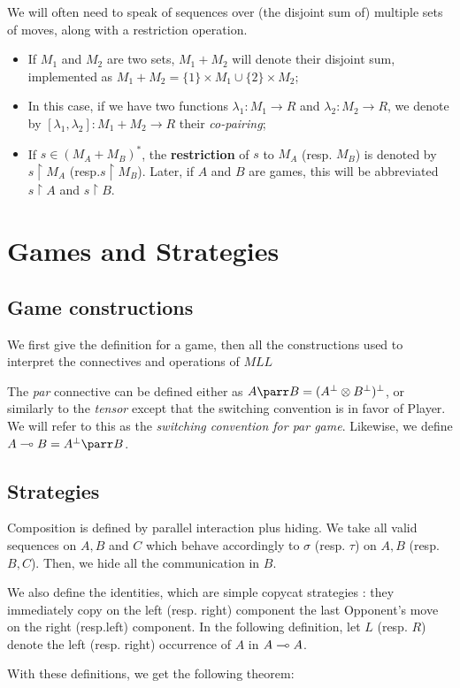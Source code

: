We will often need to speak of sequences over (the disjoint sum of)
multiple sets of moves, along with a restriction operation.

\begin{itemize}
\tightlist
\item
  If \(M_1\) and \(M_2\) are two sets, \(M_1 + M_2\) will denote their
  disjoint sum, implemented as
  \(M_1 + M_2 = \{1\}\times M_1 \cup \{2\}\times M_2\);
\item
  In this case, if we have two functions \(\lambda_1:M_1 \to R\) and
  \(\lambda_2:M_2\to R\), we denote by
  \([\lambda_1,\lambda_2]:M_1 + M_2 \to R\) their \emph{co-pairing};
\item
  If \(s\in (M_A + M_B)^*\), the \textbf{restriction} of \(s\) to
  \(M_A\) (resp. \(M_B\)) is denoted by \(s\upharpoonright M_A\)
  (resp.\(s \upharpoonright M_B\)). Later, if \(A\) and \(B\) are games,
  this will be abbreviated \(s\upharpoonright A\) and
  \(s\upharpoonright B\).
\end{itemize}

\section{Games and Strategies}\label{games-and-strategies}

\subsection{Game constructions}\label{game-constructions}

We first give the definition for a game, then all the constructions used
to interpret the connectives and operations of \(MLL\)

The \emph{par} connective can be defined either as
\(A\parr B = (A^\bot \tens B^\bot)^\bot\), or similarly to the
\emph{tensor} except that the switching convention is in favor of
Player. We will refer to this as the \emph{switching convention for par
game}. Likewise, we define \(A\limp B = A
^\bot\parr B\).

\subsection{Strategies}\label{strategies}

Composition is defined by parallel interaction plus hiding. We take all
valid sequences on \(A, B\) and \(C\) which behave accordingly to
\(\sigma\) (resp. \(\tau\)) on \(A, B\) (resp. \(B,C\)). Then, we hide
all the communication in \(B\).

We also define the identities, which are simple copycat strategies :
they immediately copy on the left (resp. right) component the last
Opponent's move on the right (resp.left) component. In the following
definition, let \(L\) (resp. \(R\)) denote the left (resp. right)
occurrence of \(A\) in \(A\multimap A\).

With these definitions, we get the following theorem:


